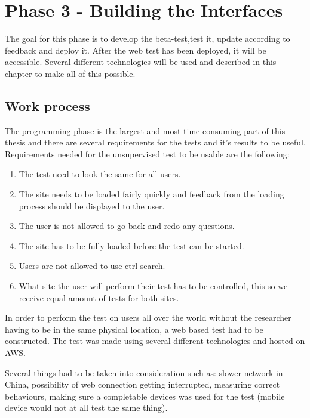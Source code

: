 
\chapter{Phase 3 - Building the Interfaces} %

\label{Chapter6} %

The goal for this phase is to develop the beta-test,test it, update according to feedback and deploy it. After the web test has been deployed, it will be accessible. Several different technologies will be used and described in this chapter to make all of this possible.
\section{Work process}
The programming phase is the largest and most time consuming part of this thesis and there are several requirements for the tests and it's results to be useful. Requirements needed for the unsupervised test to be usable are the following:

\begin{enumerate}
	\item The test need to look the same for all users.
	\item The site needs to be loaded fairly quickly and feedback from the loading process should be displayed to the user.
	\item The user is not allowed to go back and redo any questions.
	\item The site has to be fully loaded before the test can be started.
	\item Users are not allowed to use ctrl-search.
	\item What site the user will perform their test has to be controlled, this so we receive equal amount of tests for both sites.
\end{enumerate}

In order to perform the test on users all over the world without the researcher having to be in the same physical location, a web based test had to be constructed. The test was made using several different technologies and hosted on AWS. 

Several things had to be taken into consideration such as: slower network in China, possibility of web connection getting interrupted, measuring correct behaviours, making sure a completable devices was used for the test (mobile device would not at all test the same thing).


